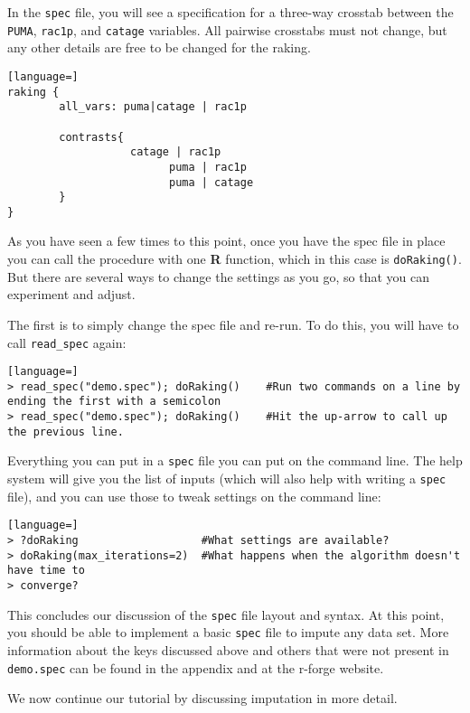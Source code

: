 \documentclass{article}
\begin{document}
In the {\tt spec} file, you will see a specification for a three-way crosstab between
the {\tt PUMA}, {\tt rac1p}, and {\tt catage} variables. All pairwise crosstabs
must not change, but any other details are free to be changed for the raking.

\begin{lstlisting}[language=]
raking {
        all_vars: puma|catage | rac1p

        contrasts{
                   catage | rac1p
                         puma | rac1p
                         puma | catage
        }
}
\end{lstlisting}

As you have seen a few times to this point, once you have the spec file in place you can
call the procedure with one \textbf{R} function, which in this case is {\tt doRaking()}. But there
are several ways to change the settings as you go, so that you can experiment and adjust.

The first is to simply change the spec file and re-run. To do this, you will have to call
{\tt read\_spec} again:
\begin{lstlisting}[language=]
> read_spec("demo.spec"); doRaking()    #Run two commands on a line by ending the first with a semicolon
> read_spec("demo.spec"); doRaking()    #Hit the up-arrow to call up the previous line.
\end{lstlisting}

Everything you can put in a {\tt spec} file you can put on the command line. The help system
will give you the list of inputs (which will also help with writing a {\tt spec} file), and you
can use those to tweak settings on the command line:
\begin{lstlisting}[language=]
> ?doRaking                   #What settings are available?
> doRaking(max_iterations=2)  #What happens when the algorithm doesn't have time to
> converge?
\end{lstlisting}


This concludes our discussion of the {\tt spec} file layout and syntax. At this point, you should be 
able to implement a basic {\tt spec} file to impute any data set. More information about the keys 
discussed above and others that were not present in {\tt demo.spec} can be found in the appendix and 
at the r-forge website.

We now continue our tutorial by discussing imputation in more detail.
\end{document}
